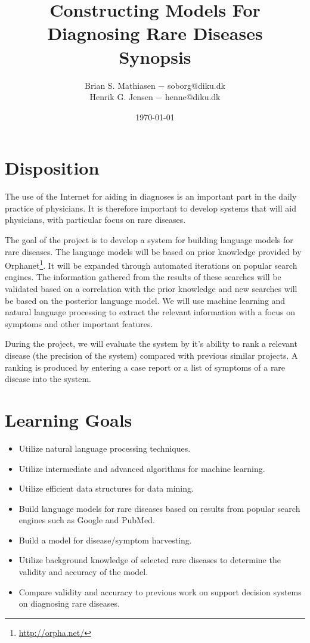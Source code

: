 \documentclass[10pt,letterpaper,final]{article}
\title{Constructing Models For Diagnosing Rare Diseases\\
        \small{Synopsis}}
\author{Brian S. Mathiasen $-$ soborg@diku.dk \\
        Henrik G. Jensen $-$ henne@diku.dk\\
}
\date{\today} %
\begin{document}
\maketitle
\section{Disposition}

The use of the Internet for aiding in diagnoses is an important part in
the daily practice of physicians. It is therefore important to develop
systems that will aid physicians, with particular focus on rare
diseases.

The goal of the project is to develop a system for building language
models for rare diseases. The language models will be based on prior
knowledge provided by Orphanet\footnote{\url{http://orpha.net/}}. It
will be expanded through automated iterations on popular search engines.
The information gathered from the results of these searches will be
validated based on a correlation with the prior knowledge and new
searches will be based on the posterior language model. We will use
machine learning and natural language processing to extract the relevant
information with a focus on symptoms and other important features.

During the project, we will evaluate the system by it’s ability to rank
a relevant disease (the precision of the system) compared with previous
similar projects. A ranking is produced by entering a case report or a
list of symptoms of a rare disease into the system.


\section{Learning Goals}
\begin{itemize}
\item Utilize natural language processing techniques.
\item Utilize intermediate and advanced algorithms for machine learning.
\item Utilize efficient data structures for data mining.
\item Build language models for rare diseases based on results from
popular search engines such as Google and PubMed.
\item Build a model for disease/symptom harvesting.
\item Utilize background knowledge of selected rare diseases to
determine the validity and accuracy of the model.
\item Compare validity and accuracy to previous work on support decision
systems on diagnosing rare diseases.
\end{itemize}
\end{document}
